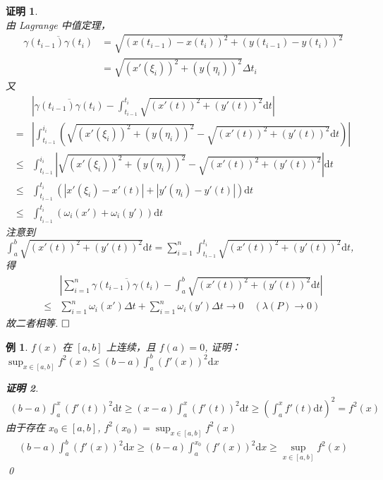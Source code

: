\documentclass{ctexart}
\newcommand{\。}{．} %
\newcommand{\dx}{\mathrm{d}x}
\newcommand{\dd}{\mathrm{d}}
\newenvironment{lanse}{
    \begin{tcolorbox}[enhanced, breakable, colback=qlan, boxrule=0pt, frame hidden,
        borderline west={0.7mm}{0.1mm}{slan}]
    }
    {\end{tcolorbox}}
\newenvironment{zise}{
    \begin{tcolorbox}[enhanced, breakable, colback=qzi, boxrule=0pt, frame hidden,
        borderline west={0.7mm}{0.1mm}{szi}]
    }
    {\end{tcolorbox}}
\theoremstyle{t} %
\newtheorem{lthj}{\color{szi} 例}[subsection]
\newtheorem*{zmhj}{\color{slan} 证明}
\newenvironment{zm}{\begin{lanse}\begin{zmhj}}{$\hfill \square$\end{zmhj}\end{lanse}}
\newenvironment{lt}{\begin{zise}\begin{lthj}}{\end{lthj}\end{zise}}
\begin{document}
\begin{zm} \quad \\
    由 Lagrange 中值定理， 
    \begin{align*}
        \overline{\gamma(t_{i - 1})\gamma(t_i)} &= \sqrt{\left(x(t_{i - 1}) - x(t_i)\right)^2 + \left(y(t_{i - 1}) - y(t_i)\right)^2} \\
        &= \sqrt{\left(x'(\xi_i)\right)^2 + \left(y(\eta_i)\right)^2} \Delta t_i
    \end{align*}
    又
    \begin{align*}
        &\left\lvert \overline{\gamma(t_{i - 1})\gamma(t_i)} - \int_{t_{i - 1}}^{t_i}\sqrt{\left(x'(t)\right)^2 + \left(y'(t)\right)^2}\dd t \right\rvert \\
        = &\left\lvert \int_{t_{i - 1}}^{i_i}\left(\sqrt{\left(x'(\xi_i)\right)^2 + \left(y(\eta_i)\right)^2} - \sqrt{\left(x'(t)\right)^2 + \left(y'(t)\right)^2} \dd t\right)\right\rvert \\
        \leqslant &\int_{t_{i - 1}}^{i_i}\left|\sqrt{\left(x'(\xi_i)\right)^2 + \left(y(\eta_i)\right)^2} - \sqrt{\left(x'(t)\right)^2 + \left(y'(t)\right)^2}\right| \dd t \\
        \leqslant & \int_{t_{i - 1}}^{t_i}\left(\left\lvert x'(\xi_i) - x'(t)\right\rvert + \left\lvert y'(\eta_i) - y'(t)\right\rvert \right) \dd t \\
        \leqslant & \int_{t_{i - 1}}^{t_i}\left(\omega_i(x') + \omega_i(y')\right)\dd t
    \end{align*}
    注意到 $\int_{a}^{b}\sqrt{\left(x'(t)\right)^2 + \left(y'(t)\right)^2}\dd t = \sum_{i = 1}^{n}\int_{t_{i - 1}}^{t_i}\sqrt{\left(x'(t)\right)^2 + \left(y'(t)\right)^2}\dd t$, 得
    \begin{align*}
        & \left\lvert \sum_{i = 1}^{n}\overline{\gamma(t_{i - 1})\gamma(t_i)} - \int_{a}^{b}\sqrt{\left(x'(t)\right)^2 + \left(y'(t)\right)^2}\dd t\right\rvert \\
        \leqslant & \sum_{i = 1}^{n}\omega_i(x')\Delta t + \sum_{i = 1}^{n}\omega_i(y')\Delta t \to 0\quad (\lambda(P) \to 0)
    \end{align*}
    故二者相等.
\end{zm}

\begin{lt}
    $f(x)$ 在 $[a, b]$ 上连续，且 $f(a) = 0$, 证明： $\sup_{x \in [a, b]}f^2(x) \leqslant (b - a)\int_{a}^{b}\left(f'(x)\right)^2\dx$
    \begin{zmhj}
        \begin{align*}
            (b - a)\int_{a}^{x}\left(f'(t)\right)^2 \dd t \geqslant (x - a)\int_{a}^{x}\left(f'(t)\right)^2 \dd t \geqslant \left(\int_{a}^{x}f'(t)\dd t\right)^2 = f^2(x)
        \end{align*}
        由于存在 $x_0 \in [a, b]$, $f^2(x_0) = \sup_{x \in [a, b]}f^2(x) $
        \begin{align*}
            (b - a)\int_{a}^{b}\left(f'(x)\right)^2\dx \geqslant (b - a)\int_{a}^{x_0 }\left(f'(x)\right)^2\dx \geqslant \sup_{x \in [a, b]}f^2(x)
        \end{align*}
        \qed
    \end{zmhj}
\end{lt}
\end{document}

